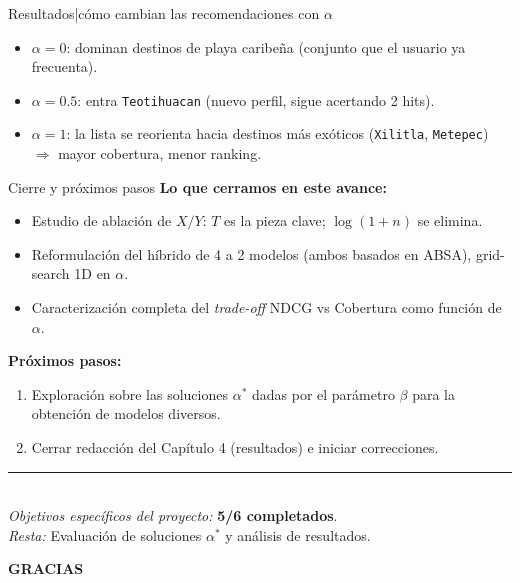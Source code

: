 \documentclass[aspectratio=169,11pt]{beamer}
\begin{document}
\begin{frame}{Resultados\;|\;c\'omo cambian las recomendaciones con $\alpha$}
	\vspace{0.3em}
	\scriptsize
	\begin{itemize}\setlength\itemsep{0pt}
		\item $\alpha\!=\!0$: dominan destinos de playa caribe\~na (conjunto que el usuario ya frecuenta).
		\item $\alpha\!=\!0.5$: entra \texttt{Teotihuacan} (nuevo perfil, sigue acertando 2 hits).
		\item $\alpha\!=\!1$: la lista se reorienta hacia destinos m\'as ex\'oticos (\texttt{Xilitla}, \texttt{Metepec}) \!$\Rightarrow$ mayor cobertura, menor ranking.
	\end{itemize}
\end{frame}

\begin{frame}{Cierre y pr\'oximos pasos}
	\small
	\textbf{Lo que cerramos en este avance:}
	\begin{itemize}\setlength\itemsep{2pt}
		\item Estudio de ablaci\'on de $X/Y$: $T$ es la pieza clave; $\log(1+n)$ se elimina.
		\item Reformulaci\'on del h\'ibrido de 4 a 2 modelos (ambos basados en ABSA), grid-search 1D en $\alpha$.
		\item Caracterizaci\'on completa del \emph{trade-off} NDCG vs Cobertura como funci\'on de $\alpha$.
	\end{itemize}

	\vspace{0.6em}
	\textbf{Pr\'oximos pasos:}
	\begin{enumerate}\setlength\itemsep{2pt}
		\item Exploración sobre las soluciones $\alpha^{*}$ dadas por el parámetro $\beta$ para la obtención de modelos diversos.
		\item Cerrar redacci\'on del Cap\'itulo 4 (resultados) e iniciar correcciones.
	\end{enumerate}

	\vspace{0.6em}
	\centering
	{\color{rule}\rule{0.5\linewidth}{0.4pt}}\\[0.4em]
	\textit{Objetivos espec\'ificos del proyecto:} \textbf{5/6 completados}.\\
	\textit{Resta:} Evaluación de soluciones $\alpha^{*}$ y análisis de resultados.
\end{frame}

\begin{frame}[plain]
	\vfill
	\begin{center}
		{\fontsize{60}{72}\selectfont\bfseries\rmfamily\color{navy}GRACIAS}
	\end{center}
	\vfill
\end{frame}
\end{document}
